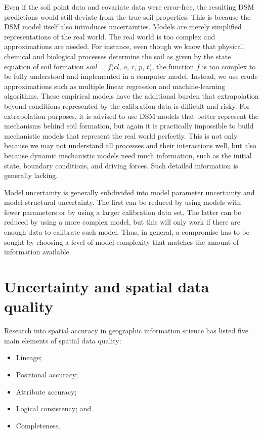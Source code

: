 \documentclass[10pt,b5paper,]{book}
\providecommand{\tightlist}{%
  \setlength{\itemsep}{0pt}\setlength{\parskip}{0pt}}
\theoremstyle{definition}
\theoremstyle{definition}
\theoremstyle{definition}
\theoremstyle{remark}
\begin{document}
Even if the soil point data and covariate data were error-free, the
resulting DSM predictions would still deviate from the true soil
properties. This is because the DSM model itself also introduces
uncertainties. Models are merely simplified representations of the real
world. The real world is too complex and approximations are needed. For
instance, even though we know that physical, chemical and biological
processes determine the soil as given by the state equation of soil
formation \(soil\) = \(f\)(\(cl\), \(o\), \(r\), \(p\), \(t\)), the
function \(f\) is too complex to be fully understood and implemented in
a computer model. Instead, we use crude approximations such as multiple
linear regression and machine-learning algorithms. These empirical
models have the additional burden that extrapolation beyond conditions
represented by the calibration data is difficult and risky. For
extrapolation purposes, it is advised to use DSM models that better
represent the mechanisms behind soil formation, but again it is
practically impossible to build mechanistic models that represent the
real world perfectly. This is not only because we may not understand all
processes and their interactions well, but also because dynamic
mechanistic models need much information, such as the initial state,
boundary conditions, and driving forces. Such detailed information is
generally lacking.

Model uncertainty is generally subdivided into model parameter
uncertainty and model structural uncertainty. The first can be reduced
by using models with fewer parameters or by using a larger calibration
data set. The latter can be reduced by using a more complex model, but
this will only work if there are enough data to calibrate such model.
Thus, in general, a compromise has to be sought by choosing a level of
model complexity that matches the amount of information available.

\hypertarget{uncertainty-and-spatial-data-quality}{%
\section{Uncertainty and spatial data
quality}\label{uncertainty-and-spatial-data-quality}}

Research into spatial accuracy in geographic information science has
listed five main elements of spatial data quality:

\begin{itemize}
\tightlist
\item
  Lineage;
\item
  Positional accuracy;
\item
  Attribute accuracy;
\item
  Logical consistency; and
\item
  Completeness.
\end{itemize}
\end{document}
